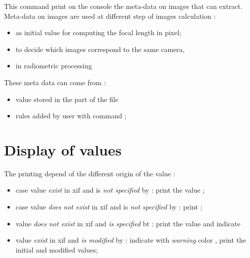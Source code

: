 \documentclass[a4paper]{article}
\begin{document}
\CmdTitle

\tableofcontents



\SecDescr

This command print on the console  the meta-data 
on images that \MMVII can extract.  
Meta-data on images are used at different step of images calculation :

\begin{itemize}
   \item as initial value for computing the focal length in pixel;
   \item to decide which images correspond to the same camera,
   \item in radiometric processing
\end{itemize}


These meta data can come from :

\begin{itemize}
   \item value stored in the   part of the  file
   \item rules added by user with command  ;
\end{itemize}


\section{Display of values}

The printing depend of the different origin of the value :

\begin{itemize}
      \item case value \emph{exist} in xif and is \emph{not specified}  by \MMVII : print the value ;
      \item case value \emph{does not exist} in xif and is \emph{not specified} by \MMVII : print ;
      \item value  \emph{does not exist}   in xif and  \emph{is specified} bt \MMVII : print the value
            and indicate 
      \item value  \emph{exist}   in xif and  \emph{is modified} by \MMVII : 
             indicate with \emph{warning} color ,
            print the initial and modified values;
\end{itemize}
\end{document}
